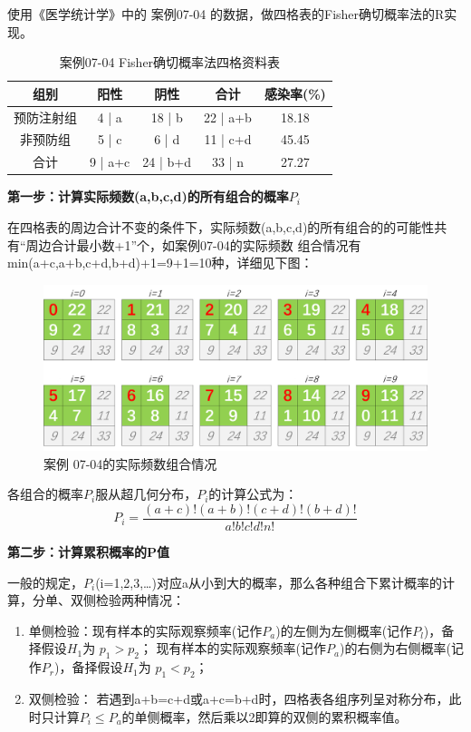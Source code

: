 \documentclass[
]{article}
\providecommand{\tightlist}{%
  \setlength{\itemsep}{0pt}\setlength{\parskip}{0pt}}
\begin{document}
使用《医学统计学》中的 案例07-04 的数据，做四格表的Fisher确切概率法的R实现。

\begin{table}

\caption{\label{tab:chisqtab3}案例07-04 Fisher确切概率法四格资料表}
\centering
\begin{tabular}[t]{ccccc}
\toprule
组别 & 阳性 & 阴性 & 合计 & 感染率(\%)\\
\midrule
预防注射组 & 4 | a & 18 | b & 22 | a+b & 18.18\\
非预防组 & 5 | c & 6 | d & 11 | c+d & 45.45\\
合计 & 9 | a+c & 24 | b+d & 33 | n & 27.27\\
\bottomrule
\end{tabular}
\end{table}

\textbf{第一步：计算实际频数(a,b,c,d)的所有组合的概率\(P_i\)}

在四格表的周边合计不变的条件下，实际频数(a,b,c,d)的所有组合的的可能性共有``周边合计最小数+1''个，如案例07-04的实际频数
组合情况有min(a+c,a+b,c+d,b+d)+1=9+1=10种，详细见下图：

\begin{figure}

{\centering \includegraphics[width=0.7\linewidth]{image/Fisherchitest} 

}

\caption{案例 07-04的实际频数组合情况}\label{fig:Fisherchitest}
\end{figure}

各组合的概率\(P_i\)服从超几何分布，\(P_i\)的计算公式为：
\[P_i=\frac{(a+c)!(a+b)!(c+d)!(b+d)!}{a!b!c!d!n!}\]

\textbf{第二步：计算累积概率的P值}

一般的规定，\(P_i\)(i=1,2,3,\ldots)对应a从小到大的概率，那么各种组合下累计概率的计算，分单、双侧检验两种情况：

\begin{enumerate}
\def\labelenumi{\arabic{enumi}.}
\tightlist
\item
  单侧检验：现有样本的实际观察频率(记作\(P_a\))的左侧为左侧概率(记作\(P_l\))，备择假设\(H_1\)为 \(p_1 > p_2\)；
  现有样本的实际观察频率(记作\(P_a\))的右侧为右侧概率(记作\(P_r\))，备择假设\(H_1\)为 \(p_1 < p_2\)；
\item
  双侧检验： 若遇到a+b=c+d或a+c=b+d时，四格表各组序列呈对称分布，此时只计算\(P_i≤P_a\)的单侧概率，然后乘以2即算的双侧的累积概率值。
\end{enumerate}
\end{document}

